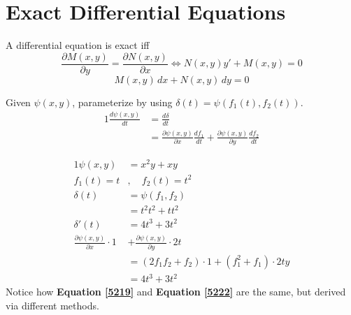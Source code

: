 \documentclass[twoside]{report}
\begin{document}
    \section{Exact Differential Equations}
    \begin{definition}
        A differential equation is exact iff
        \begin{equation}
            \frac{\partial M(x,y)}{\partial y} = \frac{\partial N(x,y)}{\partial x} \Leftrightarrow N(x, y)y' + M(x, y) = 0
        \end{equation}
        \begin{equation}
            M(x, y)\,dx + N(x, y)\,dy = 0
        \end{equation}
    \end{definition}
    Given $\psi(x, y)$, parameterize by using $\delta(t) = \psi(f_{1}(t), f_{2}(t))$.
    \begin{alignat}{1}
        \frac{d\psi(x, y)}{dt} &= \frac{d\delta}{dt}\\
        &= \frac{\partial \psi(x, y)}{\partial x}\frac{df_{1}}{dt} + \frac{\partial \psi(x, y)}{\partial y}\frac{df_{2}}{dt}
    \end{alignat}
    \begin{example}
        \begin{alignat}{1}
            \psi(x, y) &= x^{2}y + xy\\
            f_{1}(t) = t&,\quad f_{2}(t) = t^{2}\\
            \delta(t) &= \psi(f_{1}, f_{2})\\
            &= t^{2}t^{2}+t t^{2}\\
            \delta'(t) &= 4t^{3} + 3t^{2}\label{5219}\\
            \frac{\partial \psi(x, y)}{\partial x}\cdot 1 &+ \frac{\partial \psi(x, y)}{\partial y}\cdot2t\\
            &= (2f_{1}f_{2} + f_{2})\cdot 1 + (f_{1}^{2} + f_{1})\cdot 2ty\\
            &= 4t^{3} + 3t^{2}\label{5222}
        \end{alignat}
        Notice how \textbf{Equation \ref{5219}} and \textbf{Equation \ref{5222}} are the same, but derived via different methods.
    \end{example}
\end{document}
